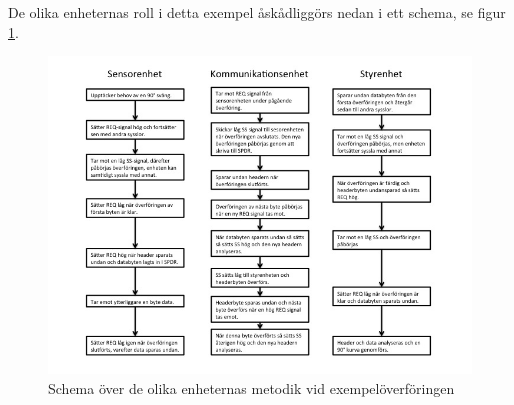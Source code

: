 De olika enheternas roll i detta exempel åskådliggörs nedan i ett schema, se figur \ref{fig:schema}.


\begin{figure}[H]
 \centering
\includegraphics[angle=0,scale=0.7]{bilder/schema_exempel.jpg}
  \caption{Schema över de olika enheternas metodik vid exempelöverföringen}
  \label{fig:schema}
\end{figure}



